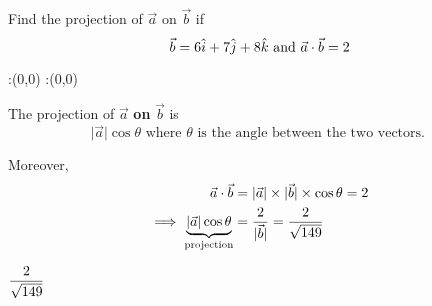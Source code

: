 


\question[1] Find the projection of $\vec{a}$ on $\vec{b}$ if 
\[ \vec{b} = 6\hat{i} + 7\hat{j} + 8\hat{k} \text{ and } \vec{a}\cdot\vec{b} = 2 \] 

\watchout

\ifprintanswers
  \begin{marginfigure}
      :(0,0)
      :(0,0)
    \figdrawbegin{}
      \figdrawline [100,101]
    \figdrawend
    \figvisu{\figBoxA}{}{%
    }
    \centerline{\box\figBoxA}
  \end{marginfigure}
\fi 

\begin{solution}[\mcq]
	The projection of $\vec{a}$ \textbf{on} $\vec{b}$ is 
  \[ \vert\vec{a}\vert\cos\theta \text{ where }\theta
	\text{ is the angle between the two vectors. } \]
	
	Moreover, \begin{align}
		\vec{a}\cdot\vec{b} &= \vert\vec{a}\vert\times\vert\vec{b}\vert\times\cos\theta = 2 \\
		\implies \underbrace{\vert\vec{a}\vert\cos\theta}_{\text{projection}} 
		&= \dfrac{2}{\vert\vec{b}\vert} = \dfrac{2}{\sqrt{149}} 
	\end{align}
\end{solution}

\ifprintanswers\begin{codex}$\dfrac{2}{\sqrt{149}}$\end{codex}\fi

